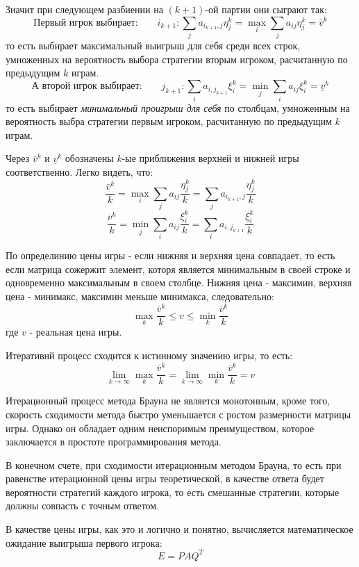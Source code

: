\documentclass[aps,%
12pt,%
final,%
oneside,
onecolumn,%
musixtex, %
superscriptaddress,%
centertags]{article} %
\theoremstyle{plain}
\theoremstyle{definition}
\theoremstyle{remark}
\begin{document}
Значит при следующем разбиении на $(k+1)$-ой партии они сыграют так:
$$\text{Первый игрок выбирает:} \qquad i_{k+1}:\sum\limits_{j}a_{i_{k+1},j}\eta_j^k = \underset{i}{\max}\sum\limits_j a_{ij}\eta_j^k = \bar{v}^k$$
то есть выбирает максимальный выигрыш для себя среди всех строк, умноженных на вероятность выбора стратегии вторым игроком, расчитанную по предыдущим $k$ играм.
$$\text{А второй игрок выбирает:} \qquad j_{k+1}:\sum\limits_{i}a_{i,j_{k+1}}\xi_i^k = \underset{j}{\min} \sum\limits_i a_{ij}\xi_i^k = \underline{v}^k$$
то есть выбирает \textit{минимальный проигрыш для себя} по столбцам, умноженным на вероятность выбра стратегии первым игроком, расчитанную по предыдущим $k$ играм.

Через $\bar{v}^k$ и $\underline{v}^k$ обозначены $k$-ые приближения верхней и нижней игры соответственно. Легко видеть, что:
$$\frac{\bar{v}^k}{k} = \underset{i}{\max}\sum\limits_j a_{ij}\frac{\eta_j^k}{k} = \sum\limits_{j}a_{i_{k+1},j}\frac{\eta_j^k}{k} $$
$$\frac{\overline{v}^k}{k} = \underset{j}{\min}\sum\limits_i a_{ij}\frac{\xi_i^k}{k} = \sum\limits_{i}a_{i,j_{k+1}}\frac{\xi_i^k}{k} $$

По определинию цены игры - если нижняя и верхняя цена совпадает, то есть если матрица сожержит элемент, которя является минимальным в своей строке и одновременно максимальным в своем столбце. Нижняя цена - максимин, верхняя цена - минимакс, максимин меньше минимакса, следовательно:
$$\underset{k}{\max} \frac{\overline{v}^k}{k} \leq v \leq \underset{k}{\min} \frac{\overline{v}^k}{k}$$
где $v$ - реальная цена игры.

Итеративнй процесс сходится к истинному значению игры, то есть:
$$\lim\limits_{k \to\infty} \underset{k}{\max} \frac{\overline{v}^k}{k} = \lim\limits_{k \to\infty} \underset{k}{\min} \frac{\overline{v}^k}{k} = v$$

Итерационный процесс метода Брауна не является монотонным, кроме того, скорость сходимости метода быстро уменьшается с ростом размерности матрицы игры. Однако он обладает одним неиспоримым преимуществом, которое заключается в простоте программирования метода.

В конечном счете, при сходимости итерационным методом Брауна, то есть при равенстве итерационной цены игры теоретической, в качестве ответа будет вероятности стратегий каждого игрока, то есть смешанные стратегии, которые должны совпасть с точным ответом.

В качестве цены игры, как это и логично и понятно, вычисляется математическое ожидание выигрыша первого игрока:
$$E = PAQ^T$$
\end{document}
